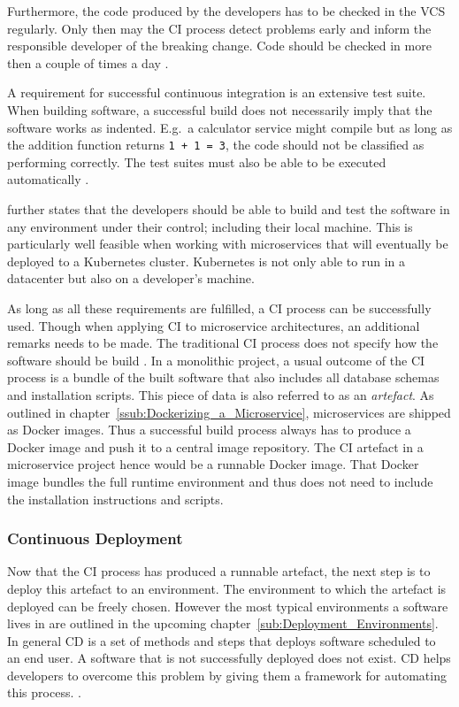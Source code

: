 Furthermore, the code produced by the developers has to be checked in the
\ac{VCS} regularly. Only then may the \ac{CI} process detect problems early and
inform the responsible developer of the breaking change. Code should be checked
in more then a couple of times a day \autocite[p.
59]{JezHumbleContinuousDelivery2010}.

A requirement for successful continuous integration is an extensive test suite.
When building software, a successful build does not necessarily imply that the
software works as indented. E.g.\ a calculator service might compile but as
long as the addition function returns \texttt{1 + 1 = 3}, the code should not be
classified as performing correctly. The test suites must also be able to be
executed automatically \autocite[p. 60]{JezHumbleContinuousDelivery2010}.

\autocite[p. 62]{JezHumbleContinuousDelivery2010} further states that the
developers should be able to build and test the software in any environment
under their control; including their local machine. This is particularly well
feasible when working with microservices that will eventually be deployed to a
Kubernetes cluster. Kubernetes is not only able to run in a datacenter but also
on a developer's machine.

As long as all these requirements are fulfilled, a \ac{CI} process can be
successfully used. Though when applying \ac{CI} to microservice architectures,
an additional remarks needs to be made. The traditional \ac{CI} process does
not specify how the software should be build \autocite[p.
18]{MatyasContinuousIntegration2007}. In a monolithic project, a usual outcome
of the \ac{CI} process is a bundle of the built software that also includes all
database schemas and installation scripts. This piece of data is also referred
to as an \textit{artefact}. As outlined in
chapter~\ref{ssub:Dockerizing_a_Microservice}, microservices are shipped as
Docker images. Thus a successful build process always has to produce a Docker
image and push it to a central image repository. The \ac{CI} artefact in a
microservice project hence would be a runnable Docker image. That Docker image
bundles the full runtime environment and thus does not need to include the
installation instructions and scripts.

\subsubsection{Continuous Deployment}%
\label{ssub:Continuous_Deployment}
Now that the \ac{CI} process has produced a runnable artefact, the next step is
to deploy this artefact to an environment. The environment to which the
artefact is deployed can be freely chosen. However the most typical
environments a software lives in are outlined in the upcoming
chapter~\ref{sub:Deployment_Environments}. In general \ac{CD} is a set of
methods and steps that deploys software scheduled to an end user. A software
that is not successfully deployed does not exist. \ac{CD} helps developers to
overcome this problem by giving them a framework for automating this process.
\autocite[pp.  190]{MatyasContinuousIntegration2007}.

